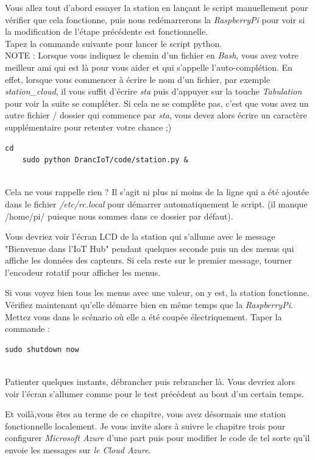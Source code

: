 Vous allez tout d'abord essayer la station en lançant le script manuellement pour vérifier que cela fonctionne, puis nous redémarrerons la \textit{RaspberryPi} pour voir si la modification de l'étape précédente est fonctionnelle.\\

Tapez la commande suivante pour lancer le script python.\\

NOTE : Lorsque vous indiquez le chemin d'un fichier en \textit{Bash}, vous avez votre meilleur ami qui est là pour vous aider et qui s'appelle l'auto-complétion. En effet, lorsque vous commencer à écrire le nom d'un fichier, par exemple \textit{station_cloud}, il vous suffit d'écrire \textit{sta} puis d'appuyer sur la touche \textit{Tabulation} pour voir la suite se compléter. Si cela ne se complète pas, c'est que vous avez un autre fichier / dossier qui commence par \textit{sta}, vous devez alors écrire un caractère supplémentaire pour retenter votre chance ;)\\

\begin{lstlisting}[style=MyBashStyle]
	cd
	sudo python DrancIoT/code/station.py &
\end{lstlisting}\\

Cela ne vous rappelle rien ? Il s'agit ni plus ni moins de la ligne qui a été ajoutée dans le fichier \textit{/etc/rc.local} pour démarrer automatiquement le script. (il manque /home/pi/ puisque nous sommes dans ce dossier par défaut).

Vous devriez voir l'écran LCD de la station qui s'allume avec le message "Bienvenue dans l'IoT Hub" pendant quelques seconde puis un des menus qui affiche les données des capteurs. Si cela reste sur le premier message, tourner l'encodeur rotatif pour afficher les menus.

Si vous voyez bien tous les menus avec une valeur, on y est, la station fonctionne. Vérifiez maintenant qu'elle démarre bien en même temps que la \textit{RaspberryPi}.
Mettez vous dans le scénario où elle a été coupée électriquement. 
Taper la commande :\\ %

\begin{lstlisting}[style=MyBashStyle]
	sudo shutdown now
\end{lstlisting}\\

Patienter quelques instants, débrancher puis rebrancher là. Vous devriez alors voir l'écran s'allumer comme pour le test précédent au bout d'un certain temps. %

Et voilà,vous êtes au terme de ce chapitre, vous avez désormais une station fonctionnelle localement. Je vous invite alors à suivre le chapitre trois pour configurer \textit{Microsoft Azure} d'une part puis pour modifier le code de tel sorte qu'il envoie les messages sur \textit{le Cloud Azure}.



	
	
